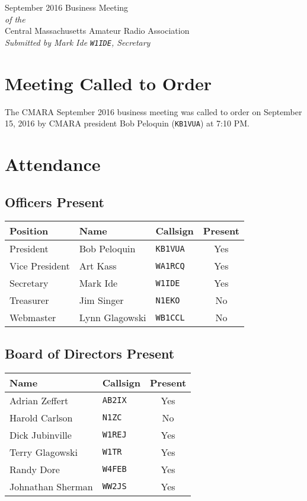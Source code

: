 \documentclass[10pt,letterpaper]{article}
\begin{document}
\begin{center}
{\huge September 2016 Business Meeting}\\
\emph{of the}\\
{\Large Central Massachusetts Amateur Radio Association}\\
\emph{Submitted by Mark Ide \texttt{W1IDE}, Secretary}
\end{center}

\section{Meeting Called to Order}
The CMARA September 2016 business meeting was called to order on September 15, 2016 by CMARA president Bob Peloquin (\texttt{KB1VUA}) at 7:10 PM.

\section{Attendance}

\subsection{Officers Present}

\begin{tabular}{|l|l|l|c|}
  \hline
  \textbf{Position} & \textbf{Name}  & \textbf{Callsign} & \textbf{Present} \\ \hline
  President         & Bob Peloquin   & \texttt{KB1VUA}   & Yes \\
  Vice President    & Art Kass       & \texttt{WA1RCQ}   & Yes \\
  Secretary         & Mark Ide       & \texttt{W1IDE}    & Yes \\
  Treasurer         & Jim Singer     & \texttt{N1EKO}    & No \\
  Webmaster         & Lynn Glagowski & \texttt{WB1CCL}   & No \\
  \hline
\end{tabular}

\subsection{Board of Directors Present}

\begin{tabular}{|l|l|c|}
  \hline
  \textbf{Name}     & \textbf{Callsign} & \textbf{Present} \\ \hline
  Adrian Zeffert    & \texttt{AB2IX}    & Yes \\
  Harold Carlson    & \texttt{N1ZC}     & No \\
  Dick Jubinville   & \texttt{W1REJ}    & Yes \\
  Terry Glagowski   & \texttt{W1TR}     & Yes \\
  Randy Dore        & \texttt{W4FEB}    & Yes \\
  Johnathan Sherman & \texttt{WW2JS}    & Yes \\
  \hline
\end{tabular}
\end{document}
